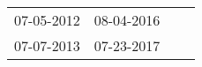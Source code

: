 \begin{supertabular}{llll}
 07-05-2012 &  08-04-2016 \\
 07-07-2013 &  07-23-2017 \\
\end{supertabular}
